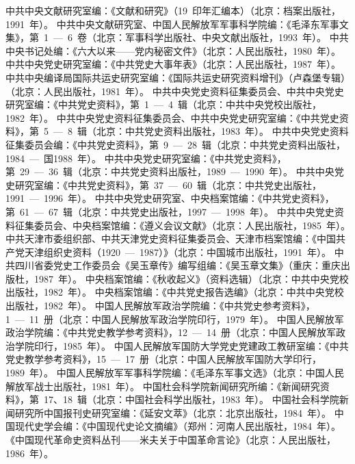 \begin{thebibliography}{999}
\bibitem{}中共中央文献研究室编：《文献和研究》（19~印年汇编本）（北京：档案出版社，1991~年）。
\bibitem{}中共中央文献研究室、中国人民解放军军事科学院编：《毛泽东军事文集》，第~1~—~6~卷（北京：军事科学出版社、中央文献出版社，1993~年）。
\bibitem{}中共中央书记处编：《六大以来——党内秘密文件》（北京：人民出版社，1980~年）。
\bibitem{}中共中央党史研究室编：《中共党史大事年表》（北京：人民出版社，1987~年）。
\bibitem{}中共中央编译局国际共运史研究室编：《国际共运史研究资料增刊》（卢森堡专辑）（北京：人民出版社，1981~年）。
\bibitem{}中共中央党史资料征集委员会、中共中央党史研究室编：《中共党史资料》，第~1~—~4~辑（北京：中共中央党校出版社，1982~年）。
\bibitem{}中共中央党史资料征集委员会、中共中央党史研究室编：《中共党史资料》，第~5~—~8~辑（北京：中共党史资料出版社，1983~年）。
\bibitem{}中共中央党史资料征集委员会编：《中共党史资料》，第~9~—~28~辑（北京：中共党史资料出版社，1984~—~国1988~年）。
\bibitem{}中共中央党史研究室编：《中共党史资料》，第~29~—~36~辑（北京：中共党史资料出版社，1989~—~1990~年）。
\bibitem{}中共中央党史研究室编：《中共党史资料》，第~37~—~60~辑（北京：中共党史出版社，1991~—~1996~年）。
\bibitem{}中共中央党史研究室、中央档案馆编：《中共党史资料》，第~61~—~67~辑（北京：中共党史出版社，1997~—~1998~年）。
\bibitem{}中共中央党史资料征集委员会、中央档案馆编：《遵义会议文献》（北京：人民出版社，1985~年）。
\bibitem{}中共天津市委组织部、中共天津党史资料征集委员会、天津市档案馆编：《中国共产党天津组织史资料（1920~—~1987）》（北京：中国城市出版社，1991~年）。
\bibitem{}中共四川省委党史工作委员会《吴玉章传》编写组编：《吴玉章文集》（重庆：重庆出版杜，1987~年）。
\bibitem{}中央档案馆编：《秋收起义》（资料选辑）（北京：中共中央党校出版社，1982~年）。
\bibitem{}中央档案馆编：《中共党史报告选编》（北京：中共中央党校出版社，1982~年）。
\bibitem{}中国人民解放军政治学院编：《中共党史参考资料》，1~—~11~册（北京：中国人民解放军政治学院印行，1979~年）。
\bibitem{}中国人民解放军政治学院编：《中共党史教学参考资料》，12~—~14~册（北京：中国人民解放军政治学院印行，1985~年）。
\bibitem{}中国人民解放军国防大学党史党建政工教研室编：《中共党史教学参考资料》，15~—~17~册（北京：中国人民解放军国防大学印行，1989~年）。
\bibitem{}中国人民解放军军事科学院编：《毛泽东军事文选》（北京：中国人民解放军战士出版社，1981~年）。
\bibitem{}中国杜会科学院新闻研究所编：《新闻研究资料》，第~17、18~辑（北京：中国社会科学出版社，1983~年）。
\bibitem{}中国社会科学院新闻研究所中国报刊史研究室编：《延安文萃》（北京：北京出版社，1984~年）。
\bibitem{}中国现代史学会编：《中国现代史论文摘编》（郑州：河南人民出版社，1984~年）。
\bibitem{}《中国现代革命史资料丛刊——米夫关于中国革命言论》（北京：人民出版社，1986~年）。

\end{thebibliography}
